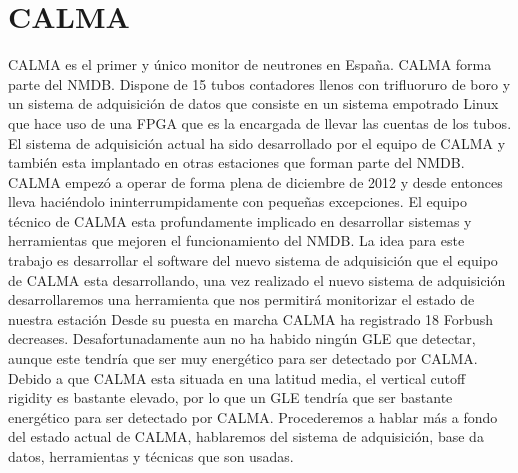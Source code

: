 \section{CALMA}
	CALMA es el primer y único monitor de neutrones en España. CALMA forma parte del NMDB. Dispone de 15 tubos contadores llenos con trifluoruro 
	de boro y un sistema de adquisición de datos que consiste en un sistema empotrado Linux que hace uso de una FPGA que es la encargada de 
	llevar las cuentas de los tubos. El sistema de adquisición actual ha sido desarrollado por el equipo de CALMA y también esta implantado en 
	otras estaciones que forman parte del NMDB. CALMA empezó a operar de forma plena de diciembre de 2012 y desde entonces lleva haciéndolo 
	ininterrumpidamente con pequeñas excepciones. El equipo técnico de  CALMA esta profundamente implicado en desarrollar sistemas y herramientas 
	que mejoren el funcionamiento del NMDB. La idea para este trabajo es desarrollar el software del nuevo sistema de adquisición que el equipo 
	de CALMA esta desarrollando, una vez realizado el nuevo sistema de adquisición desarrollaremos una herramienta que nos permitirá monitorizar 
	el estado de nuestra estación
	Desde su puesta en marcha CALMA ha registrado 18 Forbush decreases. Desafortunadamente aun no ha habido ningún GLE que detectar, aunque este
	tendría que ser muy energético para ser detectado por CALMA. Debido a que CALMA esta situada en una latitud media, el vertical cutoff rigidity
	es bastante elevado, por lo que un GLE tendría que ser bastante energético para ser detectado por CALMA. 
	Procederemos a hablar más a fondo del estado actual de CALMA, hablaremos del sistema de adquisición, base da datos, herramientas y técnicas
	que son usadas.
